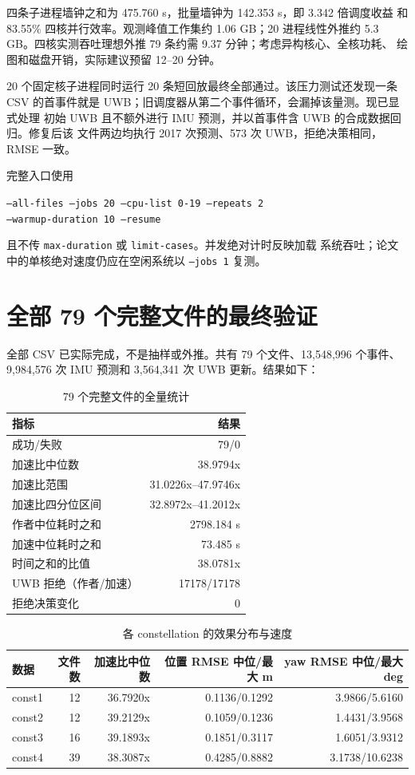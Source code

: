 \documentclass[11pt,a4paper]{ctexart}
\begin{document}
四条子进程墙钟之和为 475.760 s，批量墙钟为 142.353 s，即 3.342 倍调度收益
和 83.55\% 四核并行效率。观测峰值工作集约 1.06 GB；20 进程线性外推约
5.3 GB。四核实测吞吐理想外推 79 条约需 9.37 分钟；考虑异构核心、全核功耗、
绘图和磁盘开销，实际建议预留 12--20 分钟。

20 个固定核子进程同时运行 20 条短回放最终全部通过。该压力测试还发现一条
CSV 的首事件就是 UWB；旧调度器从第二个事件循环，会漏掉该量测。现已显式处理
初始 UWB 且不额外进行 IMU 预测，并以首事件含 UWB 的合成数据回归。修复后该
文件两边均执行 2017 次预测、573 次 UWB，拒绝决策相同，RMSE 一致。

完整入口使用
\begin{center}
\texttt{--all-files --jobs 20 --cpu-list 0-19 --repeats 2}\\
\texttt{--warmup-duration 10 --resume}
\end{center}
且不传 \texttt{max-duration} 或 \texttt{limit-cases}。并发绝对计时反映加载
系统吞吐；论文中的单核绝对速度仍应在空闲系统以 \texttt{--jobs 1} 复测。

\section{全部 79 个完整文件的最终验证}

全部 CSV 已实际完成，不是抽样或外推。共有 79 个文件、13,548,996 个事件、
9,984,576 次 IMU 预测和 3,564,341 次 UWB 更新。结果如下：
\begin{table}[H]
\centering
\caption{79 个完整文件的全量统计}
\begin{tabular}{lr}
\toprule
指标 & 结果\\
\midrule
成功/失败 & 79/0\\
加速比中位数 & 38.9794x\\
加速比范围 & 31.0226x--47.9746x\\
加速比四分位区间 & 32.8972x--41.2012x\\
作者中位耗时之和 & 2798.184 s\\
加速中位耗时之和 & 73.485 s\\
时间之和的比值 & 38.0781x\\
UWB 拒绝（作者/加速） & 17178/17178\\
拒绝决策变化 & 0\\
\bottomrule
\end{tabular}
\end{table}

\begin{table}[H]
\centering
\caption{各 constellation 的效果分布与速度}
\begin{tabular}{lrrrr}
\toprule
数据 & 文件数 & 加速比中位数 & 位置 RMSE 中位/最大 m & yaw RMSE 中位/最大 deg\\
\midrule
const1 & 12 & 36.7920x & 0.1136/0.1292 & 3.9866/5.6160\\
const2 & 12 & 39.2129x & 0.1059/0.1236 & 1.4431/3.9568\\
const3 & 16 & 39.1893x & 0.1851/0.3117 & 1.6051/3.9312\\
const4 & 39 & 38.3087x & 0.4285/0.8882 & 3.1738/10.6238\\
\bottomrule
\end{tabular}
\end{table}
\end{document}
